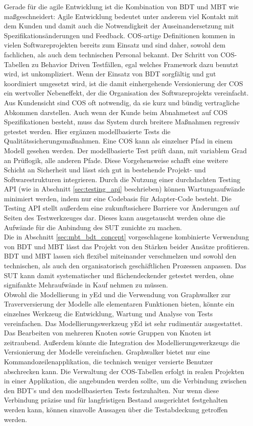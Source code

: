 Gerade für die agile Entwicklung ist die Kombination von \Gls{BDT} und \Gls{MBT} wie maßgeschneidert: Agile Entwicklung bedeutet unter anderem viel Kontakt mit dem Kunden und damit auch die Notwendigkeit der Auseinandersetzung mit Spezifikationsänderungen und Feedback. \Gls{COS}-artige Definitionen kommen in vielen Softwareprojekten bereits zum Einsatz und sind daher, sowohl dem fachlichen, als auch dem technischen Personal bekannt. Der Schritt von \Gls{COS}-Tabellen zu Behavior Driven Testfällen, egal welches Framework dazu benutzt wird, ist unkompliziert. Wenn der Einsatz von \Gls{BDT} sorgfältig und gut koordiniert umgesetzt wird, ist die damit einhergehende Versionierung der \Gls{COS} ein wertvoller Nebeneffekt, der die Organisation des Softwareprojekts vereinfacht. Aus Kundensicht sind \Gls{COS} oft notwendig, da sie kurz und bündig vertragliche Abkommen darstellen. Auch wenn der Kunde beim Abnahmetest auf \Gls{COS} Spezifikationen besteht, muss das System durch breitere Maßnahmen regressiv getestet werden. Hier ergänzen modellbasierte Tests die Qualitätssicherungsmaßnahmen. Eine \Gls{COS} kann als einzelner Pfad in einem Modell gesehen werden. Der modellbasierte Test prüft dann, mit variablem Grad an Prüflogik, alle anderen Pfade. Diese Vorgehensweise schafft eine weitere Schicht an Sicherheit und lässt sich gut in bestehende Projekt- und Softwarestrukturen integrieren. Durch die Nutzung einer durchdachten Testing API (wie in Abschnitt \ref{sec:testing_api} beschrieben) können Wartungsaufwände minimiert werden, indem nur eine Codebasis für Adapter-Code besteht. Die Testing API stellt außerdem eine zukunftssichere Barriere vor Änderungen auf Seiten des Testwerkzeuges dar. Dieses kann ausgetauscht werden ohne die Aufwände für die Anbindung des \Gls{SUT} zunichte zu machen.\\
Die in Abschnitt \ref{sec:mbt_bdt_concept} vorgeschlagene kombinierte Verwendung von \Gls{BDT} und \Gls{MBT} lässt das Projekt von den Stärken beider Ansätze profitieren. \Gls{BDT} und \Gls{MBT} lassen sich flexibel miteinander verschmelzen und sowohl den technischen, als auch den organisatorisch geschäftlichen Prozessen anpassen. Das \Gls{SUT} kann damit systematischer und flächendeckender getestet werden, ohne signifankte Mehraufwände in Kauf nehmen zu müssen.\\
Obwohl die Modellierung in yEd und die Verwendung von Graphwalker zur Traverversierung der Modelle alle elementaren Funktionen bieten, könnte ein einzelnes Werkzeug die Entwicklung, Wartung und Analyse von Tests vereinfachen. Das Modellierungswerkzeug yEd ist sehr rudimentär ausgestattet. Das Bearbeiten von mehreren Knoten sowie Gruppen von Knoten ist zeitraubend. Außerdem könnte die Integration des Modellierungswerkzeugs die Versionierung der Modelle vereinfachen. Graphwalker bietet nur eine Kommandozeilenapplikation, die technisch weniger versierte Benutzer abschrecken kann. Die Verwaltung der \Gls{COS}-Tabellen erfolgt in realen Projekten in einer Applikation, die angebunden werden sollte, um die Verbindung zwischen den \Gls{BDT}'s und den modellbasierten Tests festzuhalten. Nur wenn diese Verbindung präzise und für langfristigen Bestand ausgerichtet festgehalten werden kann, können sinnvolle Aussagen über die Testabdeckung getroffen werden. 